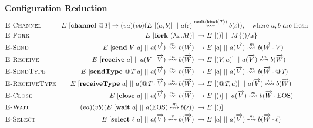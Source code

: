 \documentclass[a4paper,11pt]{article}
\newcommand{\mbf}[1]{\mathbf{#1}}
\newcommand{\channel}{\mbf{channel}}
\newcommand{\fork}{\mbf{fork}}
\newcommand{\send}{\mbf{send}}
\newcommand{\receive}{\mbf{receive}}
\newcommand{\close}{\mbf{close}}
\newcommand{\wait}{\mbf{wait}}
\newcommand{\sendType}{\mbf{sendType}}
\newcommand{\receiveType}{\mbf{receiveType}}
\newcommand{\select}{\mbf{select}}
\newcommand{\mcal}[1]{\mathcal{#1}}
\newcommand{\C}{\mcal{C}}
\newcommand{\D}{\mcal{D}}
\newcommand{\m}{\textit{\text{m}}}
\newcommand{\T}{\textit{\text{T}}}
\newcommand{\run}[2]{#1~[#2]}
\newcommand{\toparrow}[1]{\overrightarrow{#1}}
\newcommand{\vv}{\toparrow{V}}
\newcommand{\ww}{\toparrow{W}}
\newcommand{\buf}[5]{#1(#2) \overset{#3}{\leftrightsquigarrow} #4(#5)}
\newcommand{\eos}{\text{EOS}}
\newcommand{\lbl}{\ell}
\newcommand{\empt}{\scalerel*{\mcal{E}}{\epsilon}}
\newcommand{\rrule}[1]{\textsc{\text{#1}}}
\theoremstyle{plain}
\theoremstyle{nonumberplain}
\begin{document}
\textbf{Configuration Reduction} \hfill \fbox{$\C \rightarrow \D$}
\begin{align*}
  & \rrule{E-Channel} \quad\quad\quad \lefteqn{\run{E}{\channel~@\T}                                                          \rightarrow (va)(vb)(\run{E}{(a,b)}~||~\buf{a}{\empt}{\text{mult}(\text{kind}(\T))}{b}{\empt}), \quad \text{where}~a,b~\text{are fresh}} \\
  & \rrule{E-Fork}           &~ \run{E}{\fork~(\lambda x.M)}                                                               &~ \rightarrow \run{E}{()}~||~M\{()/x\}                                                                                                     \\
  & \rrule{E-Send}           &~ \run{E}{\send~V~a}~||~\buf{a}{\vv}{\m}{b}{\ww}                                             &~ \rightarrow \run{E}{a}~||~\buf{a}{\vv}{\m}{b}{\ww \cdot V}                                                                               \\
  & \rrule{E-Receive}        &~ \run{E}{\receive~a}~||~\buf{a}{V \cdot \vv}{\m}{b}{\ww}                                    &~ \rightarrow \run{E}{(V,a)}~||~\buf{a}{\vv}{\m}{b}{\ww}                                                                                   \\
  & \rrule{E-SendType}       &~ \run{E}{\sendType~@\T~a}~||~\buf{a}{\vv}{\m}{b}{\ww}                                       &~ \rightarrow \run{E}{a}~||~\buf{a}{\vv}{\m}{b}{\ww \cdot @\T}                                                                             \\
  & \rrule{E-ReceiveType}    &~ \run{E}{\receiveType~a}~||~\buf{a}{@\T \cdot \vv}{\m}{b}{\ww}                              &~ \rightarrow \run{E}{(@\T,a)}~||~\buf{a}{\vv}{\m}{b}{\ww}                                                                                 \\
  & \rrule{E-Close}          &~ \run{E}{\close~a}~||~\buf{a}{\vv}{\m}{b}{\ww}                                              &~ \rightarrow \run{E}{()}~||~\buf{a}{\vv}{\m}{b}{\ww \cdot \eos}                                                                           \\
  & \rrule{E-Wait}           &~ (va)(vb)(\run{E}{\wait~a}~||~\buf{a}{\eos}{\m}{b}{\empt})                                  &~ \rightarrow \run{E}{()}                                                                                                                  \\
  & \rrule{E-Select}         &~ \run{E}{\select~\lbl~a}~||~\buf{a}{\vv}{\m}{b}{\ww}                                        &~ \rightarrow \run{E}{a}~||~\buf{a}{\vv}{\m}{b}{\ww \cdot \lbl}                                                                            \\

\end{align*}
\end{document}
